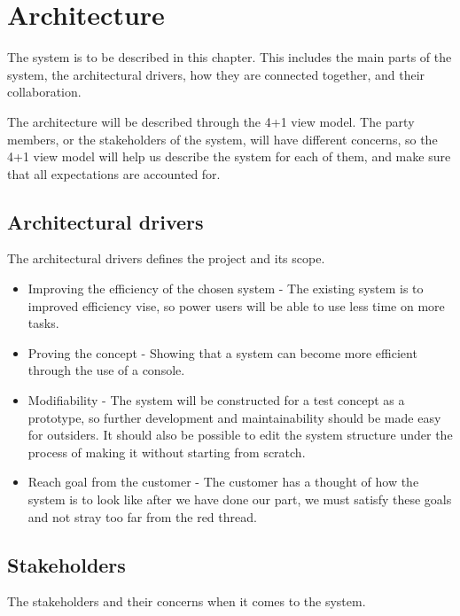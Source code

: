 \chapter{Architecture}

The system is to be described in this chapter. This includes the main parts of the system, the architectural drivers, how they are connected together, and their collaboration. 

The architecture will be described through the 4+1 view model. The party members, or the stakeholders of the system, will have different concerns, so the 4+1 view model will help us describe the system for each of them, and make sure that all expectations are accounted for.  


\section{Architectural drivers}
The architectural drivers defines the project and its scope. 

\begin{itemize}
    \item Improving the efficiency of the chosen system - The existing system is to improved efficiency vise, so power users will be able to use less time on more tasks. 
    \item Proving the concept - Showing that a system can become more efficient through the use of a console. 
    \item Modifiability - The system will be constructed for a test concept as a prototype, so further development and maintainability should be made easy for outsiders. It should also be possible to edit the system structure under the process of making it without starting from scratch. 
    \item Reach goal from the customer - The customer has a thought of how the system is to look like after we have done our part, we must satisfy these goals and not stray too far from the red thread.  
\end{itemize}


\section{Stakeholders}
The stakeholders and their concerns when it comes to the system.

